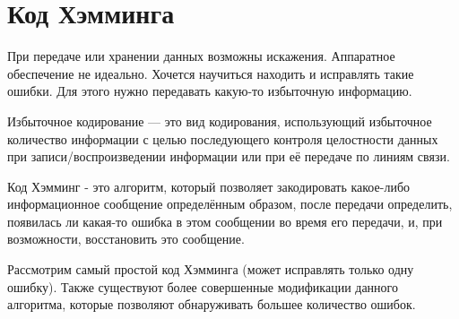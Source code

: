 
\section{Код Хэмминга}
При передаче или хранении данных возможны искажения. Аппаратное обеспечение не идеально. 
Хочется научиться находить и исправлять такие ошибки. Для этого нужно передавать какую-то избыточную информацию.

Избыточное кодирование --- это вид кодирования, использующий избыточное количество информации с 
целью последующего контроля целостности данных при записи/воспроизведении информации или при её передаче по 
линиям связи.

Код Хэмминг - это алгоритм, который позволяет закодировать какое-либо информационное сообщение определённым 
образом, после передачи определить, появилась ли какая-то ошибка в этом сообщении во время его передачи, и, 
при возможности, восстановить это сообщение. 

Рассмотрим самый простой код Хэмминга (может исправлять только одну ошибку). Также существуют более совершенные 
модификации данного алгоритма, которые позволяют обнаруживать большее количество ошибок.

